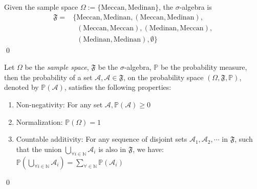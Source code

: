 \begin{exmpx}
Given the sample space $\Omega:=\{\text{Meccan},\text{Medinan}\}$, the $\sigma$-algebra is
\begin{align}
    \mathfrak{F}=&\{\text{Meccan},\text{Medinan},(\text{Meccan},\text{Medinan}),\nonumber\\
    &\;\;(\text{Meccan},\text{Meccan}), (\text{Medinan},\text{Meccan}),\nonumber\\
    &\;\;(\text{Medinan},\text{Medinan}),\emptyset\}
\end{align}
\qed
\end{exmpx}
\begin{defnx}\label{defn:probability_measure}
Let $\Omega$ be the \textit{sample space}, $\mathfrak{F}$ be the $\sigma$-algebra, $\mathbb{P}$ be the probability measure, then the probability of a set $\mathscr{A}, \mathscr{A}\in\mathfrak{F}$, on the probability space $(\Omega,\mathfrak{F},\mathbb{P})$, denoted by $\mathbb{P}(\mathscr{A})$, satisfies the following properties:
\begin{enumerate}
    \item Non-negativity: For any set $\mathscr{A}, \mathbb{P}(\mathscr{A})\geq 0$
    \item Normalization: $\mathbb{P}(\Omega)=1$
    \item Countable additivity: For any sequence of disjoint sets $\mathscr{A}_1,\mathscr{A}_2,\cdots$ in $\mathfrak{F}$, such that the union $\bigcup_{\forall i \in\mathbb{N}}\mathscr{A}_i$ is also in $\mathfrak{F}$, we have: $\mathbb{P}\left(\displaystyle\bigcup_{\forall i\in\mathbb{N}}\mathscr{A}_i\right)=\displaystyle\sum_{\forall \in\mathbb{N}}\mathbb{P}(\mathscr{A}_i)$
\end{enumerate}
\qed
\end{defnx}

